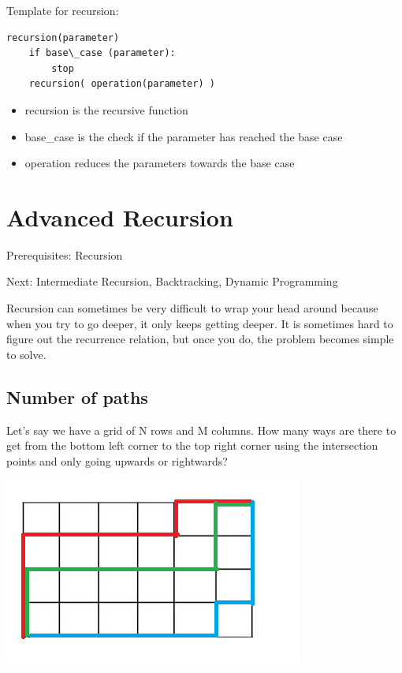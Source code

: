 \documentclass[11pt,oneside]{book}
\makeatletter
\def\maxwidth#1{\ifdim\Gin@nat@width>#1 #1\else\Gin@nat@width\fi}
\makeatother
\begin{document}
Template for recursion:

\begin{lstlisting}
recursion(parameter)
    if base\_case (parameter):
        stop
    recursion( operation(parameter) )
\end{lstlisting}

\begin{itemize}
\item recursion is the recursive function
\item base\_case is the check if the parameter has reached the base case
\item operation reduces the parameters towards the base case
\end{itemize}

\section{Advanced Recursion}

Prerequisites: Recursion

Next: Intermediate Recursion, Backtracking, Dynamic Programming

Recursion can sometimes be very difficult to wrap your head around because when you try to go deeper, it only keeps getting deeper. It is sometimes hard to figure out the recurrence relation, but once you do, the problem becomes simple to solve.

\subsection{Number of paths}

Let's say we have a grid of N rows and M columns. How many ways are there to get from the bottom left corner to the top right corner using the intersection points and only going upwards or rightwards?

\includegraphics[width=\maxwidth{\textwidth}]{recursion_grid.png}
\end{document}
